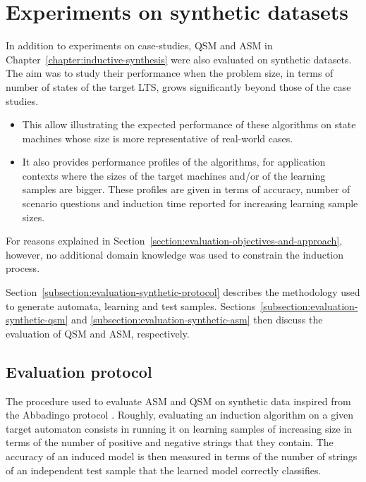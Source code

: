 \section{Experiments on synthetic datasets\label{section:evaluation-experiments-on-synthetic-data}}

In addition to experiments on case-studies, QSM and ASM in Chapter~\ref{chapter:inductive-synthesis} were also evaluated on synthetic datasets. The aim was to study their performance when the problem size, in terms of number of states of the target LTS, grows significantly beyond those of the case studies. 
\begin{itemize}
\item This allow illustrating the expected performance of these algorithms on state machines whose size is more representative of real-world cases. 
\item It also provides performance profiles of the algorithms, for application contexts where the sizes of the target machines and/or of the learning samples are bigger. These profiles are given in terms of accuracy, number of scenario questions and induction time reported for increasing learning sample sizes.
\end{itemize}

For reasons explained in Section~\ref{section:evaluation-objectives-and-approach}, however, no additional domain knowledge was used to constrain the induction process.

Section~\ref{subsection:evaluation-synthetic-protocol} describes the methodology used to generate automata, learning and test samples. Sections~\ref{subsection:evaluation-synthetic-qsm} and \ref{subsection:evaluation-synthetic-asm} then discuss the evaluation of QSM and ASM, respectively.

\subsection{Evaluation protocol\label{subsection:evaluation-synthetic-protocol}}

The procedure used to evaluate ASM and QSM on synthetic data inspired from the Abbadingo protocol \cite{Lang:1998}. Roughly, evaluating an induction algorithm on a given target automaton consists in running it on learning samples of increasing size in terms of the number of positive and negative strings that they contain. The accuracy of an induced model is then measured in terms of the number of strings of an independent test sample that the learned model correctly classifies.

